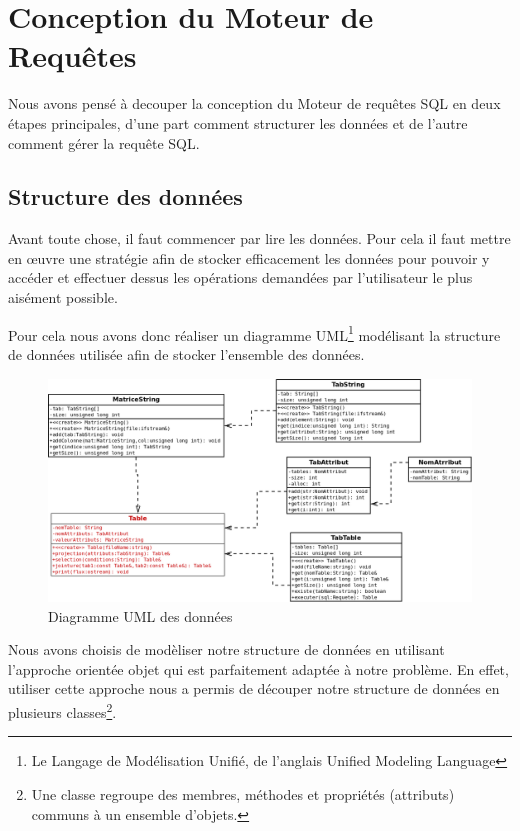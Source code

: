 \documentclass[oneside,13pt,a4paper]{report}
\begin{document}

\chapter{Conception du Moteur de Requêtes}

Nous avons pensé à decouper la conception du Moteur de requêtes SQL en deux étapes principales, d'une part comment structurer les données et de l'autre comment gérer la requête SQL.

\section{Structure des données}

Avant toute chose, il faut commencer par lire les données. Pour cela il faut mettre en \oe uvre une stratégie afin de stocker efficacement les données pour pouvoir 
y accéder et effectuer dessus les opérations demandées par l’utilisateur le plus aisément possible.

Pour cela nous avons donc réaliser un diagramme UML\footnote{Le Langage de Modélisation Unifié, de l'anglais Unified Modeling Language} modélisant la structure de données utilisée afin de stocker  l’ensemble des données.

\begin{figure}[h]
	\includegraphics[width=1\textwidth]{img/sql.png}\par
	\vspace{0.1cm}
	\caption{Diagramme UML des données}
\end{figure}

\pagebreak

Nous avons choisis de modèliser notre structure de données en utilisant l'approche orientée objet qui est parfaitement adaptée à notre problème. En effet, 
utiliser cette approche nous a permis de découper notre structure de données en plusieurs classes\footnote{Une classe regroupe des membres, méthodes et propriétés (attributs) communs à un ensemble d'objets.}.
\end{document}

